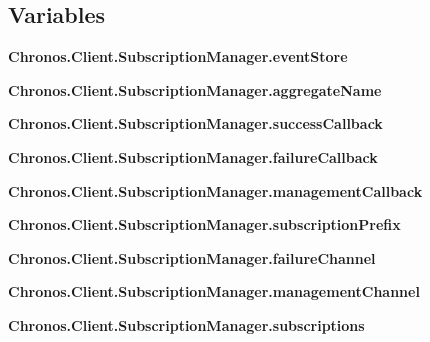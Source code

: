\subsection*{Variables}
\begin{DoxyCompactItemize}
\item 
{\bfseries Chronos.\+Client.\+Subscription\+Manager.\+event\+Store}\hypertarget{group__Chronos_ga9c41ddb193d68746ae43fe9427bff3bc}{}\label{group__Chronos_ga9c41ddb193d68746ae43fe9427bff3bc}

\item 
{\bfseries Chronos.\+Client.\+Subscription\+Manager.\+aggregate\+Name}\hypertarget{group__Chronos_gad0ffbdb938244ead3314ae7e1982b1ff}{}\label{group__Chronos_gad0ffbdb938244ead3314ae7e1982b1ff}

\item 
{\bfseries Chronos.\+Client.\+Subscription\+Manager.\+success\+Callback}\hypertarget{group__Chronos_ga9cf02404d6e184dd10f0d0ba84eb4474}{}\label{group__Chronos_ga9cf02404d6e184dd10f0d0ba84eb4474}

\item 
{\bfseries Chronos.\+Client.\+Subscription\+Manager.\+failure\+Callback}\hypertarget{group__Chronos_gaf4066c760de8711f55cdd1d23bc7d041}{}\label{group__Chronos_gaf4066c760de8711f55cdd1d23bc7d041}

\item 
{\bfseries Chronos.\+Client.\+Subscription\+Manager.\+management\+Callback}\hypertarget{group__Chronos_ga0d076af4739e2d1177301416bd557b12}{}\label{group__Chronos_ga0d076af4739e2d1177301416bd557b12}

\item 
{\bfseries Chronos.\+Client.\+Subscription\+Manager.\+subscription\+Prefix}\hypertarget{group__Chronos_ga9f1db4cf9065d0bc32ae023d66e3ea48}{}\label{group__Chronos_ga9f1db4cf9065d0bc32ae023d66e3ea48}

\item 
{\bfseries Chronos.\+Client.\+Subscription\+Manager.\+failure\+Channel}\hypertarget{group__Chronos_ga70ae1c6fe452331fb8b15521a5bd866a}{}\label{group__Chronos_ga70ae1c6fe452331fb8b15521a5bd866a}

\item 
{\bfseries Chronos.\+Client.\+Subscription\+Manager.\+management\+Channel}\hypertarget{group__Chronos_ga5120796e6cf019fd4f63814f709fc70e}{}\label{group__Chronos_ga5120796e6cf019fd4f63814f709fc70e}

\item 
{\bfseries Chronos.\+Client.\+Subscription\+Manager.\+subscriptions}\hypertarget{group__Chronos_ga4d659bf4d28432c123dc5a3270666c1b}{}\label{group__Chronos_ga4d659bf4d28432c123dc5a3270666c1b}


\end{DoxyCompactItemize}
